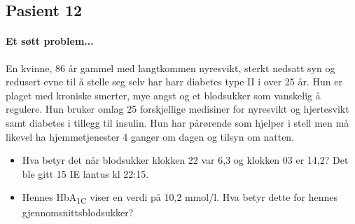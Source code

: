 			\subsection{Pasient 12}
				\paragraph{Et søtt problem...\\}
					En kvinne, 86 år gammel med langtkommen nyresvikt, sterkt nedsatt syn og redusert evne til å stelle seg selv har harr diabetes type II i over 25 år. Hun er plaget med kroniske smerter, mye angst og et blodsukker som vanskelig å regulere. Hun bruker omlag 25 forskjellige medisiner for nyresvikt og hjertesvikt samt diabetes i tillegg til insulin. Hun har pårørende som hjelper i stell men må likevel ha hjemmetjenester 4 ganger om dagen og tilsyn om natten.

				\begin{itemize}
					\item Hva betyr det når blodsukker klokken 22 var 6,3 og klokken 03 er 14,2? Det ble gitt 15 IE lantus kl 22:15.\\ %
					\item Hennes HbA\textsubscript{1C} viser en verdi på 10,2 mmol/l. Hva betyr dette for hennes gjennomsnittsblodsukker?
				\end{itemize}


